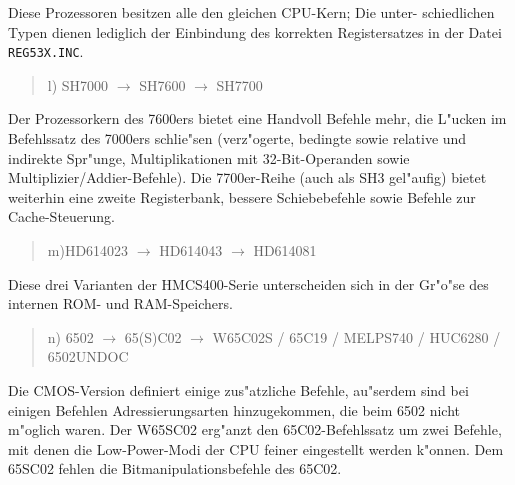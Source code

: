 \documentclass[12pt,a4paper,twoside]{report}
\newcommand{\tty}[1]{{\tt #1}}
\begin{document}
Diese Prozessoren besitzen alle den gleichen CPU-Kern; Die unter-
schiedlichen Typen dienen lediglich der Einbindung des korrekten
Registersatzes in der Datei \tty{REG53X.INC}.
\begin{quote}
l) SH7000 $\longrightarrow$ SH7600 $\longrightarrow$ SH7700
\end{quote}
Der Prozessorkern des 7600ers bietet eine Handvoll Befehle mehr, die
L"ucken im Befehlssatz des 7000ers schlie"sen (verz"ogerte, bedingte
sowie relative und indirekte Spr"unge, Multiplikationen mit 32-Bit-Operanden
sowie Multiplizier/Addier-Befehle).  Die 7700er-Reihe (auch als SH3
gel"aufig) bietet weiterhin eine zweite Registerbank, bessere
Schiebebefehle sowie Befehle zur Cache-Steuerung.
\begin{quote}
m)HD614023 $\longrightarrow$ HD614043 $\longrightarrow$ HD614081
\end{quote}
Diese drei Varianten der HMCS400-Serie unterscheiden sich in der
Gr"o"se des internen ROM- und RAM-Speichers.
\begin{quote}
n) 6502 $\rightarrow$ 65(S)C02 $\rightarrow$ W65C02S / 65C19 / MELPS740
/ HUC6280 / 6502UNDOC
\end{quote}
Die CMOS-Version definiert einige zus"atzliche Befehle, au"serdem sind
bei einigen Befehlen Adressierungsarten hinzugekommen, die beim 6502
nicht m"oglich waren.  Der W65SC02 erg"anzt den
65C02-Befehlssatz um zwei Befehle, mit denen die Low-Power-Modi
der CPU feiner eingestellt werden k"onnen.  Dem 65SC02 fehlen die
Bitmanipulationsbefehle des 65C02.
\end{document}
